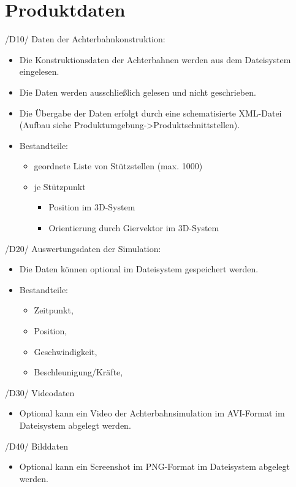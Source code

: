 
\chapter{Produktdaten}

/D10/ Daten der Achterbahnkonstruktion:
\begin{itemize}
\item Die Konstruktionsdaten der Achterbahnen werden aus dem Dateisystem eingelesen.
\item Die Daten werden ausschließlich gelesen und nicht geschrieben.
\item Die Übergabe der Daten erfolgt durch eine schematisierte XML-Datei (Aufbau siehe Produktumgebung->Produktschnittstellen).
\item Bestandteile:
	\begin{itemize}
	\item geordnete Liste von Stützstellen (max. 1000)
	\item je Stützpunkt
		\begin{itemize}
		\item Position im 3D-System
		\item Orientierung durch Giervektor im 3D-System
		\end{itemize}
	\end{itemize}
\end{itemize}

/D20/ Auswertungsdaten der Simulation:
\begin{itemize}
\item Die Daten können optional im Dateisystem gespeichert werden.
\item Bestandteile:
\begin{itemize}
\item Zeitpunkt,
\item Position,
\item Geschwindigkeit,
\item Beschleunigung/Kräfte,
\end{itemize}
\end{itemize}

/D30/ Videodaten
\begin{itemize}
\item  Optional kann ein Video der Achterbahnsimulation im AVI-Format im Dateisystem abgelegt werden.
\end{itemize}

/D40/ Bilddaten
\begin{itemize}
\item  Optional kann ein Screenshot im PNG-Format im Dateisystem abgelegt werden.
\end{itemize}
